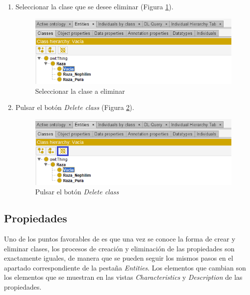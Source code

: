 \begin{enumerate}
    \item Seleccionar la clase que se desee eliminar (Figura \ref*{DeleteClass_1}).
    \begin{figure}[ht]
        \centering
        \includegraphics[scale=0.6]{Figures/Protege/DeleteClass_1.png}
        \caption{Seleccionar la clase a eliminar}
        \label{DeleteClass_1}
    \end{figure}

    \item Pulsar el botón \textit{Delete class} (Figura \ref*{DeleteClass_2}).
    \begin{figure}[ht]
        \centering
        \includegraphics[scale=0.6]{Figures/Protege/DeleteClass_2.png}
        \caption{Pulsar el botón \textit{Delete class}}
        \label{DeleteClass_2}
    \end{figure}
\end{enumerate}

\subsection{Propiedades}
Uno de los puntos favorables de \protege es que una vez se conoce la forma de crear y eliminar clases, los procesos de creación y 
eliminación de las propiedades son exactamente iguales, de manera que se pueden seguir los mismos pasos en el apartado correspondiente 
de la pestaña \textit{Entities}. Los elementos que cambian son los elementos que se muestran en las vistas 
\textit{Characteristics} y \textit{Description} de las propiedades. \medskip

